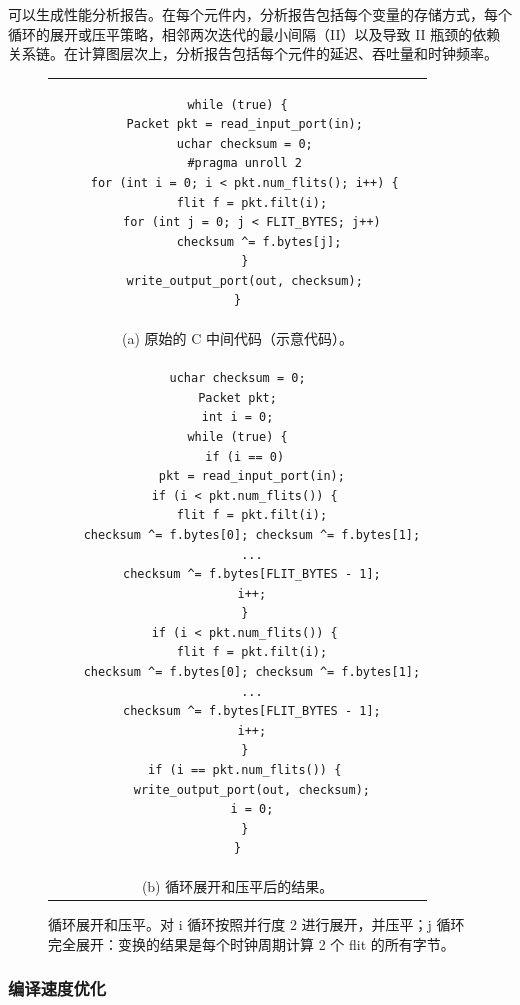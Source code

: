 \name 可以生成性能分析报告。在每个元件内，分析报告包括每个变量的存储方式，每个循环的展开或压平策略，相邻两次迭代的最小间隔（II）以及导致 II 瓶颈的依赖关系链。在计算图层次上，分析报告包括每个元件的延迟、吞吐量和时钟频率。

\begin{figure}
	\lstset{style=numbers}
	
	\centering
	\renewcommand{\baselinestretch}{0.75}
	\begin{tabular}{c}
		{
			\small
\begin{lstlisting}[escapechar=@]
while (true) {
  Packet pkt = read_input_port(in);
  uchar checksum = 0;
  #pragma unroll 2
  for (int i = 0; i < pkt.num_flits(); i++) {
    flit f = pkt.filt(i);
    for (int j = 0; j < FLIT_BYTES; j++)
      checksum ^= f.bytes[j];
  }
  write_output_port(out, checksum);
}
\end{lstlisting} 
		} \\
		(a) 原始的 C 中间代码（示意代码）。  \\
		{
			\small 
\begin{lstlisting}[escapechar=@]
uchar checksum = 0;
Packet pkt;
int i = 0;
while (true) {
  if (i == 0)
    pkt = read_input_port(in);
  if (i < pkt.num_flits()) {
    flit f = pkt.filt(i);
    checksum ^= f.bytes[0]; checksum ^= f.bytes[1];
    ...
    checksum ^= f.bytes[FLIT_BYTES - 1];
    i++;
  }
  if (i < pkt.num_flits()) {
    flit f = pkt.filt(i);
    checksum ^= f.bytes[0]; checksum ^= f.bytes[1];
    ...
    checksum ^= f.bytes[FLIT_BYTES - 1];
    i++;
  }
  if (i == pkt.num_flits()) {
    write_output_port(out, checksum);
    i = 0;
  }
}
\end{lstlisting} 
		} \\
		(b) 循环展开和压平后的结果。
	\end{tabular}
	\caption{循环展开和压平。对 i 循环按照并行度 2 进行展开，并压平；j 循环完全展开：变换的结果是每个时钟周期计算 2 个 flit 的所有字节。}
	\label{clicknp:fig:flatten}
\end{figure}

\subsubsection{编译速度优化}

